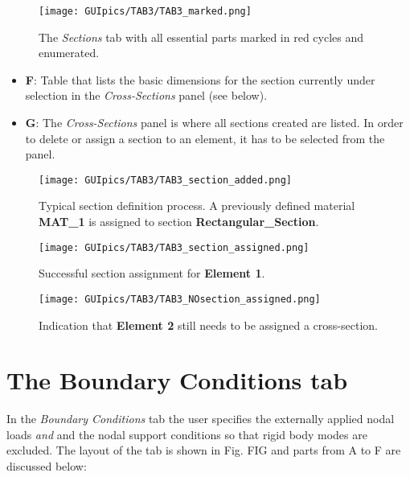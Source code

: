 \begin{figure}
	\centering
	\texttt{[image: GUIpics/TAB3/TAB3\_marked.png]}
	\caption{The \textit{Sections} tab with all essential parts marked in red 
		cycles and enumerated.}
	\label{fig:TAB3_marked}
\end{figure}

\begin{itemize}
	\item \textbf{F}: Table that lists the basic dimensions for the section 
	currently under selection in the \textit{Cross-Sections} panel (see below).
	\item \textbf{G}: The \textit{Cross-Sections} panel is where all sections 
	created are listed. In order to delete or assign a section to an element, 
	it has to be selected from the panel. 
\end{itemize}
\clearpage
\begin{figure}[t]
	\centering
	\texttt{[image: GUIpics/TAB3/TAB3\_section\_added.png]}
	\caption{Typical section definition process. A previously defined material 
	\textbf{MAT\_1} is assigned to section \textbf{Rectangular\_Section}.}
	\label{fig:TAB3_section_added}
\end{figure}

\begin{figure}[b]
	\centering
	\texttt{[image: GUIpics/TAB3/TAB3\_section\_assigned.png]}
	\caption{Successful section assignment for \textbf{Element 1}.}
	\label{fig:TAB3_section_assigned}
\end{figure}
\clearpage
\begin{figure}
	\centering
	\texttt{[image: GUIpics/TAB3/TAB3\_NOsection\_assigned.png]}
	\caption{Indication that \textbf{Element 2} still needs to be assigned a 
	cross-section.}
	\label{fig:TAB3_NOsection_assigned}
\end{figure}

\section{The Boundary Conditions tab}

In the \textit{Boundary Conditions} tab the user specifies the externally 
applied nodal loads \textit{and} and the nodal support conditions so that rigid 
body modes are excluded. The layout of the tab is shown in Fig. FIG and parts 
from A to F are discussed below:

